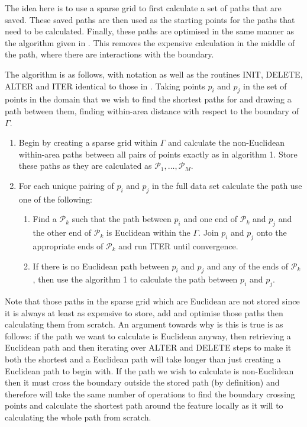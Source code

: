 The idea here is to use a sparse grid to first calculate a set of paths that are saved. These saved paths are then used as the starting points for the paths that need to be calculated. Finally, these paths are optimised in the same manner as the algorithm given in . This removes the expensive calculation in the middle of the path, where there are interactions with the boundary.

The algorithm is as follows, with notation as well as the routines INIT, DELETE, ALTER and ITER identical to those in . Taking points $p_i$ and $p_j$ in the set of points in the domain that we wish to find the shortest paths for and drawing a path between them, finding within-area distance with respect to the boundary of $\Gamma$.

\begin{enumerate}
 \item Begin by creating a sparse grid within $\Gamma$ and calculate the non-Euclidean within-area paths between all pairs of points exactly as in algorithm 1. Store these paths as they are calculated as $\mathcal{P}_1,\ldots, \mathcal{P}_M$.
\item For each unique pairing of $p_i$ and $p_j$ in the full data set calculate the path use one of the following:
	\begin{enumerate}
	\item Find a $\mathcal{P}_k$ such that the path between $p_i$ and one end of $\mathcal{P}_k$ and $p_j$ and the other end of $\mathcal{P}_k$ is Euclidean within the $\Gamma$. Join $p_i$ and $p_j$ onto the appropriate ends of $\mathcal{P}_k$ and run ITER until convergence.
	\item If there is no Euclidean path between $p_i$ and $p_j$ and any of the ends of $\mathcal{P}_k$, then use the algorithm 1 to calculate the path between $p_i$ and $p_j$. 
	\end{enumerate}
\end{enumerate}

Note that those paths in the sparse grid which are Euclidean are not stored since it is always at least as expensive to store, add and optimise those paths then calculating them from scratch. An argument towards why is this is true is as follows: if the path we want to calculate is Euclidean anyway, then retrieving a Euclidean path and then iterating over ALTER and DELETE steps to make it both the shortest and a Euclidean path will take longer than just creating a Euclidean path to begin with. If the path we wish to calculate is non-Euclidean then it must cross the boundary outside the stored path (by definition) and therefore will take the same number of operations to find the boundary crossing points and calculate the shortest path around the feature locally as it will to calculating the whole path from scratch.


